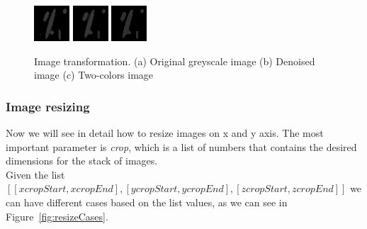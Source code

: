 \documentclass[11pt,oneside]{article}	%
\begin{document}
\begin{figure}[htb] %
   \centering
   \includegraphics[width=0.30\linewidth]{images/grayscalesample.png} \hfill
   \includegraphics[width=0.30\linewidth]{images/denoised.png} \hfill
   \includegraphics[width=0.30\linewidth]{images/quantized.png} \hfill
   \caption{Image transformation. (a) Original greyscale image (b) Denoised image (c) Two-colors image}
   \label{fig:imageTransformation}
\end{figure}

\subsubsection{Image resizing}\label{sec:imageResize}

Now we will see in detail how to resize images on x and y axis. The most important parameter is \textit{crop}, which is a list of numbers that contains the desired dimensions for the stack of images.\\ Given the list $[[xcropStart, xcropEnd],[ycropStart, ycropEnd],[zcropStart, zcropEnd]]$ we can have different cases based on the list values, as we can see in Figure~\ref{fig:resizeCases}.
\end{document}
